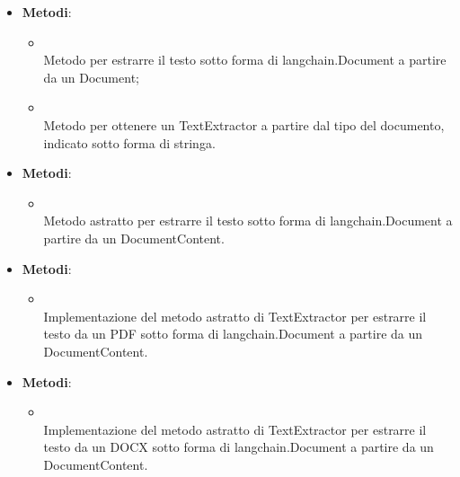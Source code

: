 \documentclass[10pt, a4paper]{article}
\begin{document}
\label{DocumentToTextDettaglio}
\begin{itemize}
    \item \textbf{Metodi}:
    \begin{itemize}
        \item {}\\
        Metodo per estrarre il testo sotto forma di langchain.Document a partire da un Document;
        \item {}\\
        Metodo per ottenere un TextExtractor a partire dal tipo del documento, indicato sotto forma di stringa.
    \end{itemize}
\end{itemize}

\label{TextExtractorDettaglio}
\begin{itemize}
    \item \textbf{Metodi}:
    \begin{itemize}
        \item {}\\
        Metodo astratto per estrarre il testo sotto forma di langchain.Document a partire da un DocumentContent.
    \end{itemize}
\end{itemize}

\label{PDFTextExtractorDettaglio}
\begin{itemize}
    \item \textbf{Metodi}:
    \begin{itemize}
        \item {}\\
        Implementazione del metodo astratto di TextExtractor per estrarre il testo da un PDF sotto forma di langchain.Document a partire da un DocumentContent.
    \end{itemize}
\end{itemize}

\label{DOCXTextExtractorDettaglio}
\begin{itemize}
    \item \textbf{Metodi}:
    \begin{itemize}
        \item {}\\
        Implementazione del metodo astratto di TextExtractor per estrarre il testo da un DOCX sotto forma di langchain.Document a partire da un DocumentContent.
    \end{itemize}
\end{itemize}
\end{document}
